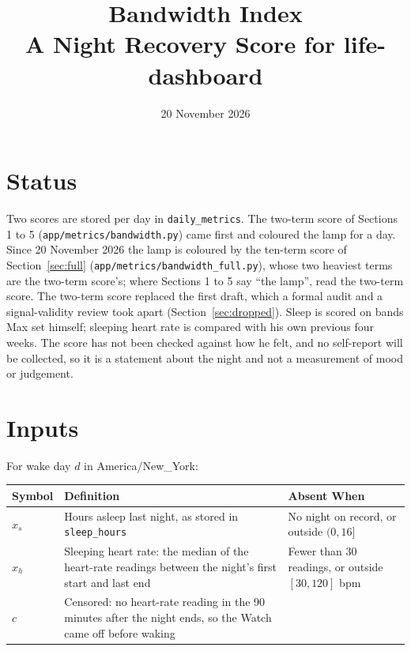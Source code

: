 \documentclass[11pt]{article}
\title{Bandwidth Index\\[2pt]\large A Night Recovery Score for life-dashboard}
\author{}
\date{20 November 2026}
\begin{document}
\maketitle

\section*{Status}
Two scores are stored per day in \texttt{daily\_metrics}. The two-term score of
Sections 1 to 5 (\texttt{app/metrics/bandwidth.py}) came first and coloured the
lamp for a day. Since 20 November 2026 the lamp is coloured by the ten-term score
of Section~\ref{sec:full} (\texttt{app/metrics/bandwidth\_full.py}), whose two
heaviest terms are the two-term score's; where Sections 1 to 5 say ``the lamp'',
read the two-term score. The two-term score replaced the first draft, which a formal audit and a
signal-validity review took apart (Section~\ref{sec:dropped}). Sleep is scored on
bands Max set himself; sleeping heart rate is compared with his own previous four
weeks. The score has not been checked against how he felt, and no self-report
will be collected, so it is a statement about the night and not a measurement of
mood or judgement.

\section{Inputs}
For wake day $d$ in America/New\_York:
\begin{center}
\begin{tabular}{L{0.10\textwidth}L{0.52\textwidth}L{0.28\textwidth}}
\toprule
Symbol & Definition & Absent When \\
\midrule
$x_s$ & Hours asleep last night, as stored in \texttt{sleep\_hours} &
  No night on record, or outside $(0, 16]$ \\
$x_h$ & Sleeping heart rate: the median of the heart-rate readings between the
  night's first start and last end & Fewer than 30 readings, or outside
  $[30, 120]$ bpm \\
$c$ & Censored: no heart-rate reading in the 90 minutes after the night ends,
  so the Watch came off before waking & \\
\bottomrule
\end{tabular}
\end{center}
\end{document}
